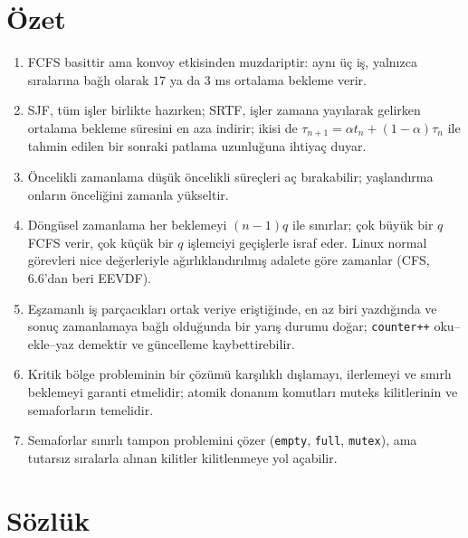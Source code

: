 \section{Özet}

\begin{keyidea}
\begin{enumerate}[leftmargin=1.4em]
  \item FCFS basittir ama konvoy etkisinden muzdariptir: aynı üç iş, yalnızca sıralarına bağlı olarak $17$ ya da $3$ ms ortalama bekleme verir.
  \item SJF, tüm işler birlikte hazırken; SRTF, işler zamana yayılarak gelirken ortalama bekleme süresini en aza indirir; ikisi de $\tau_{n+1} = \alpha t_n + (1-\alpha)\tau_n$ ile tahmin edilen bir sonraki patlama uzunluğuna ihtiyaç duyar.
  \item Öncelikli zamanlama düşük öncelikli süreçleri aç bırakabilir; yaşlandırma onların önceliğini zamanla yükseltir.
  \item Döngüsel zamanlama her beklemeyi $(n-1)q$ ile sınırlar; çok büyük bir $q$ FCFS verir, çok küçük bir $q$ işlemciyi geçişlerle israf eder. Linux normal görevleri nice değerleriyle ağırlıklandırılmış adalete göre zamanlar (CFS, 6.6'dan beri EEVDF).
  \item Eşzamanlı iş parçacıkları ortak veriye eriştiğinde, en az biri yazdığında ve sonuç zamanlamaya bağlı olduğunda bir yarış durumu doğar; \texttt{counter++} oku--ekle--yaz demektir ve güncelleme kaybettirebilir.
  \item Kritik bölge probleminin bir çözümü karşılıklı dışlamayı, ilerlemeyi ve sınırlı beklemeyi garanti etmelidir; atomik donanım komutları muteks kilitlerinin ve semaforların temelidir.
  \item Semaforlar sınırlı tampon problemini çözer (\texttt{empty}, \texttt{full}, \texttt{mutex}), ama tutarsız sıralarla alınan kilitler kilitlenmeye yol açabilir.
\end{enumerate}
\end{keyidea}

\section{Sözlük}


